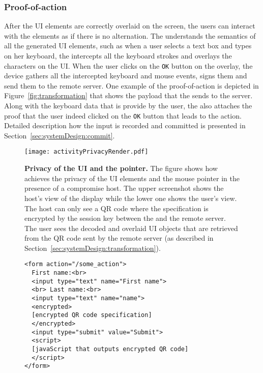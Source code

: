 \subsubsection{Proof-of-action} After the UI elements are correctly overlaid on the screen, the users can interact with the elements as if there is no alternation. The \device understands the semantics of all the generated UI elements, such as when a user selects a text box and types on her keyboard, the \device intercepts all the keyboard strokes and overlays the characters on the UI. When the user clicks on the \texttt{OK} button on the overlay, the device gathers all the intercepted keyboard and mouse events, signs them and send them to the remote server. One example of the proof-of-action is depicted in Figure~\ref{fig:transformation} that shows the payload that the \device sends to the server. Along with the keyboard data that is provide by the user, the \device also attaches the proof that the user indeed clicked on the \texttt{OK} button that leads to the action. Detailed description how the input is recorded and committed is presented in Section~\ref{sec:systemDesign:commit}.

\begin{figure}[t]
\centering
\texttt{[image: activityPrivacyRender.pdf]}
\caption{\textbf{Privacy of the UI and the pointer.} The figure shows how \name achieves the privacy of the UI elements and the mouse pointer in the presence of a compromise host. The upper screenshot shows the host's view of the display while the lower one shows the user's view. The host can only see a QR code where the specification is encrypted by the \tls session key between the \device and the remote server. The user sees the decoded and overlaid UI objects that are retrieved from the QR code sent by the remote server (as described in Section~\ref{sec:systemDesign:transformation}).}
\label{fig:activityPrivacy}
\centering
\end{figure}



\begin{figure}[t]
\small
\begin{lstlisting}[mathescape=true]
<form action="/some_action">
  First name:<br>
  <input type="text" name="First name">
  <br> Last name:<br>
  <input type="text" name="name">
  <encrypted>
  [encrypted QR code specification]
  </encrypted>
  <input type="submit" value="Submit">
  <script>
  [javaScript that outputs encrypted QR code]
  </script>
</form> 
\end{lstlisting} 
\end{figure}


